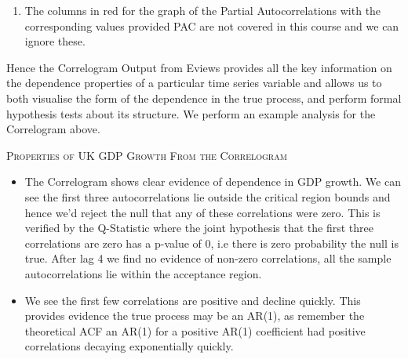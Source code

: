 \documentclass[openany]{tufte-book} %
\begin{document}
\begin{enumerate}
\textbf{The corresponding entry to the right in the column Prob is the p-value for this test, i.e the probability that this joint null hypothesis is true.} Namely it is the probability that a $\chi^2_k$ takes a value at least as large as $Q$, i.e $\Pr\{\chi^2_k>Q \}$. If the null is true we know that $Q$ was drawn  from a  $\chi^2_k$ and hence the probability of observing a value at least as large as  $Q$ corresponds to how likely it is the null holds. If this probability is very small it is unlikely to observe the statistic as large as $Q$ if the null were true (as we know it came from a $\chi^2_k$ in this case).

    \item The columns in red for the graph of the Partial Autocorrelations with the corresponding values provided  PAC are not covered in this course and we can ignore these.
\end{enumerate}

Hence the Correlogram Output from Eviews provides all the key information on the dependence properties of a particular time series variable and allows us to both visualise the form of the dependence in the true process, and perform formal hypothesis tests about its structure. We perform an example analysis for the Correlogram above.\newline \vspace{0.5cm}

\textsc{Properties of UK GDP Growth From the Correlogram}
\begin{itemize}

\item The Correlogram shows clear evidence of
dependence in GDP growth. We can see the first three autocorrelations lie outside the critical region bounds and hence we'd reject the null that any of these correlations were zero. This is verified by the Q-Statistic where the joint hypothesis that the first three correlations are zero has a p-value of 0, i.e there is zero probability the null is true.  After lag 4 we  find no evidence of non-zero correlations, all the sample autocorrelations lie  within the acceptance region.
\item We see the first few correlations are positive and decline quickly. This provides evidence the true process may be an AR(1), as remember the theoretical ACF an AR(1) for a positive AR(1) coefficient had positive correlations decaying exponentially quickly.

\end{itemize}
\end{document}
